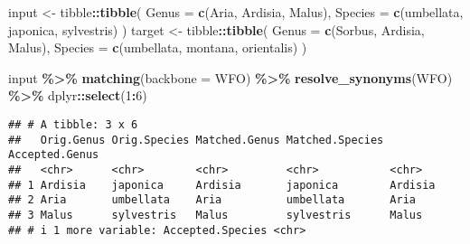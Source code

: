 \documentclass[
  11pt,
]{article}
\newenvironment{Shaded}{\begin{snugshade}}{\end{snugshade}}
\newcommand{\AttributeTok}[1]{\textcolor[rgb]{0.13,0.29,0.53}{#1}}
\newcommand{\DecValTok}[1]{\textcolor[rgb]{0.00,0.00,0.81}{#1}}
\newcommand{\FunctionTok}[1]{\textcolor[rgb]{0.13,0.29,0.53}{\textbf{#1}}}
\newcommand{\NormalTok}[1]{#1}
\newcommand{\OtherTok}[1]{\textcolor[rgb]{0.56,0.35,0.01}{#1}}
\newcommand{\SpecialCharTok}[1]{\textcolor[rgb]{0.81,0.36,0.00}{\textbf{#1}}}
\newcommand{\StringTok}[1]{\textcolor[rgb]{0.31,0.60,0.02}{#1}}
\begin{document}
\begin{Shaded}
\begin{Highlighting}[]
\NormalTok{input }\OtherTok{\textless{}{-}}\NormalTok{ tibble}\SpecialCharTok{::}\FunctionTok{tibble}\NormalTok{(}
  \AttributeTok{Genus =} \FunctionTok{c}\NormalTok{(}\StringTok{\textquotesingle{}Aria\textquotesingle{}}\NormalTok{, }\StringTok{\textquotesingle{}Ardisia\textquotesingle{}}\NormalTok{, }\StringTok{\textquotesingle{}Malus\textquotesingle{}}\NormalTok{),}
  \AttributeTok{Species =} \FunctionTok{c}\NormalTok{(}\StringTok{\textquotesingle{}umbellata\textquotesingle{}}\NormalTok{, }\StringTok{\textquotesingle{}japonica\textquotesingle{}}\NormalTok{, }\StringTok{\textquotesingle{}sylvestris\textquotesingle{}}\NormalTok{)}
\NormalTok{)}
\NormalTok{target }\OtherTok{\textless{}{-}}\NormalTok{ tibble}\SpecialCharTok{::}\FunctionTok{tibble}\NormalTok{(}
  \AttributeTok{Genus =} \FunctionTok{c}\NormalTok{(}\StringTok{\textquotesingle{}Sorbus\textquotesingle{}}\NormalTok{, }\StringTok{\textquotesingle{}Ardisia\textquotesingle{}}\NormalTok{, }\StringTok{\textquotesingle{}Malus\textquotesingle{}}\NormalTok{),}
  \AttributeTok{Species =} \FunctionTok{c}\NormalTok{(}\StringTok{\textquotesingle{}umbellata\textquotesingle{}}\NormalTok{, }\StringTok{\textquotesingle{}montana\textquotesingle{}}\NormalTok{, }\StringTok{\textquotesingle{}orientalis\textquotesingle{}}\NormalTok{)}
\NormalTok{)}
\end{Highlighting}
\end{Shaded}

\small

\begin{Shaded}
\begin{Highlighting}[]
\NormalTok{input }\SpecialCharTok{\%\textgreater{}\%}
  \FunctionTok{matching}\NormalTok{(}\AttributeTok{backbone =} \StringTok{\textquotesingle{}WFO\textquotesingle{}}\NormalTok{) }\SpecialCharTok{\%\textgreater{}\%}
  \FunctionTok{resolve\_synonyms}\NormalTok{(}\StringTok{\textquotesingle{}WFO\textquotesingle{}}\NormalTok{) }\SpecialCharTok{\%\textgreater{}\%}
\NormalTok{  dplyr}\SpecialCharTok{::}\FunctionTok{select}\NormalTok{(}\DecValTok{1}\SpecialCharTok{:}\DecValTok{6}\NormalTok{)}
\end{Highlighting}
\end{Shaded}

\begin{verbatim}
## # A tibble: 3 x 6
##   Orig.Genus Orig.Species Matched.Genus Matched.Species Accepted.Genus
##   <chr>      <chr>        <chr>         <chr>           <chr>         
## 1 Ardisia    japonica     Ardisia       japonica        Ardisia       
## 2 Aria       umbellata    Aria          umbellata       Aria          
## 3 Malus      sylvestris   Malus         sylvestris      Malus         
## # i 1 more variable: Accepted.Species <chr>
\end{verbatim}
\end{document}

